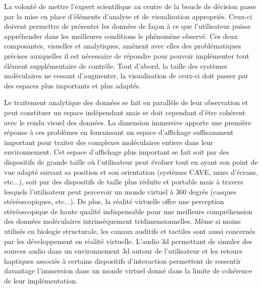 La volonté de mettre l'expert scientifique au centre de la boucle de décision passe par la mise en place d'éléments d'analyse et de visualisation appropriés. Ceux-ci doivent permettre de présenter les données de façon à ce que l'utilisateur puisse appréhender dans les meilleures conditions le phénomène observé. Ces deux composantes, visuelles et analytiques, amènent avec elles des problématiques précises auxquelles il est nécessaire de répondre pour pouvoir implémenter tout élément supplémentaire de contrôle. Tout d'abord, la taille des systèmes moléculaires ne cessant d'augmenter, la visualisation de ceux-ci doit passer par des espaces plus importants et plus adaptés.

Le traitement analytique des données se fait en parallèle de leur observation et peut constituer un espace indépendant mais se doit cependant d'être cohérent avec le rendu visuel des données. La dimension immersive apporte une première réponse à ces problèmes en fournissant un espace d'affichage suffisamment important pour traiter des complexes moléculaires entiers dans leur environnement. Cet espace d'affichage plus important se fait soit par des dispositifs de grande taille où l'utilisateur peut évoluer tout en ayant son point de vue adapté suivant sa position et son orientation (systèmes CAVE, murs d'écrans, etc...), soit par des dispositifs de taille plus réduite et portable mais à travers lesquels l'utilisateur peut percevoir un monde virtuel à 360 degrés (casques stéréoscopiques, etc...). De plus, la réalité virtuelle offre une perception stéréoscopique de haute qualité indispensable pour une meilleure compréhension des données moléculaires intrinsèquement tridimensionnelles. Même si moins utilisés en biologie structurale, les canaux auditifs et tactiles sont aussi concernés par les développement en réalité virtuelle. L'audio 3d permettant de simuler des sources audio dans un environnement 3d autour de l'utilisateur et les retours haptiques associés à certains dispositifs d'interaction permettent de ressentir davantage l'immersion dans un monde virtuel donné dans la limite de cohérence de leur implémentation. 

